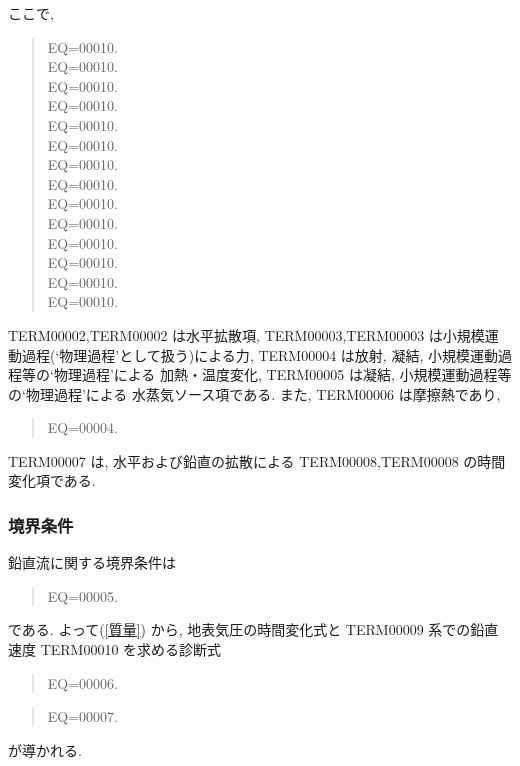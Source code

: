 ここで,
%
\begin{quote}
EQ=00010.\\
EQ=00010.\\
EQ=00010.\\
EQ=00010.\\
EQ=00010.\\
EQ=00010.\\
EQ=00010.\\
\label{渦度定義}
EQ=00010.\\
\label{発散定義}
EQ=00010.\\
\label{B項}
EQ=00010.\\
\label{A項}
EQ=00010.\\
\label{E項}
EQ=00010.\\
\nonumber
EQ=00010.\\
EQ=00010.
\end{quote}

TERM00002,TERM00002
は水平拡散項,
TERM00003,TERM00003
は小規模運動過程(`物理過程'として扱う)による力,
TERM00004 は放射, 凝結, 小規模運動過程等の`物理過程'による
加熱・温度変化,
TERM00005 は凝結, 小規模運動過程等の`物理過程'による
水蒸気ソース項である.
また, TERM00006 は摩擦熱であり,
%
\begin{quote}
EQ=00004.
\end{quote}
%
TERM00007 は,
水平および鉛直の拡散による TERM00008,TERM00008 の時間変化項である.

\subsubsection{境界条件}

鉛直流に関する境界条件は
%
\begin{quote}
EQ=00005.
\end{quote}
%
である. よって(\ref{質量}) から,
地表気圧の時間変化式と
TERM00009 系での鉛直速度 TERM00010 を求める診断式
%
\begin{quote}
EQ=00006.
\label{気圧傾向}
\end{quote}
%
\begin{quote}
EQ=00007.
\label{鉛直速度}
\end{quote}
%
が導かれる.



